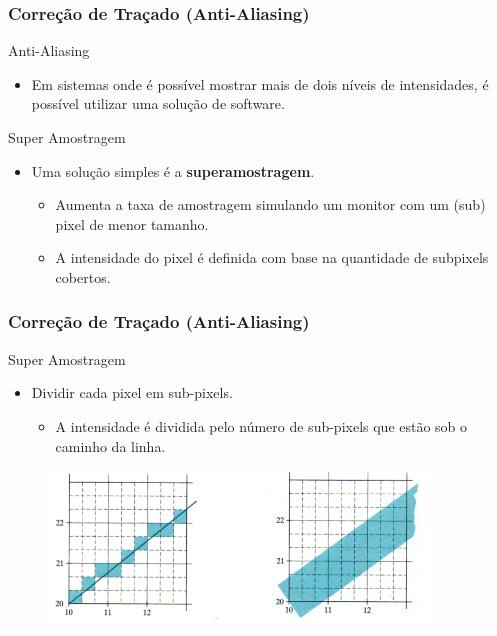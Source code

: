 \documentclass{beamer}
\begin{document}
\begin{frame}
\frametitle{Correção de Traçado (Anti-Aliasing)}
	\begin{block}{Anti-Aliasing}
		\begin{itemize}
			\item Em sistemas onde é possível mostrar mais de dois níveis de intensidades, é possível utilizar uma solução de software.
		\end{itemize}
	\end{block}
	\begin{block}{Super Amostragem}
		\begin{itemize}
			\item Uma solução simples é a \textbf{superamostragem}.
				\begin{itemize}
					\item Aumenta a taxa de amostragem simulando um monitor com um (sub) pixel de menor tamanho.
					\item A intensidade do pixel é definida com base na quantidade de subpixels cobertos.
				\end{itemize}
		\end{itemize}
	\end{block}

\end{frame}


\begin{frame}
\frametitle{Correção de Traçado (Anti-Aliasing)}
	\begin{block}{Super Amostragem}
		\begin{itemize}
			\item Dividir cada pixel em sub-pixels.
				\begin{itemize}
					\item A intensidade é dividida pelo número de sub-pixels que estão sob o caminho da linha.
				\end{itemize}
		\end{itemize}
	\end{block}

	\begin{figure}[!h]
			\begin{center}
				\includegraphics[width=0.9\textwidth]{Figures/Sub}
			\end{center}
		\end{figure}
\end{frame}
\end{document}
